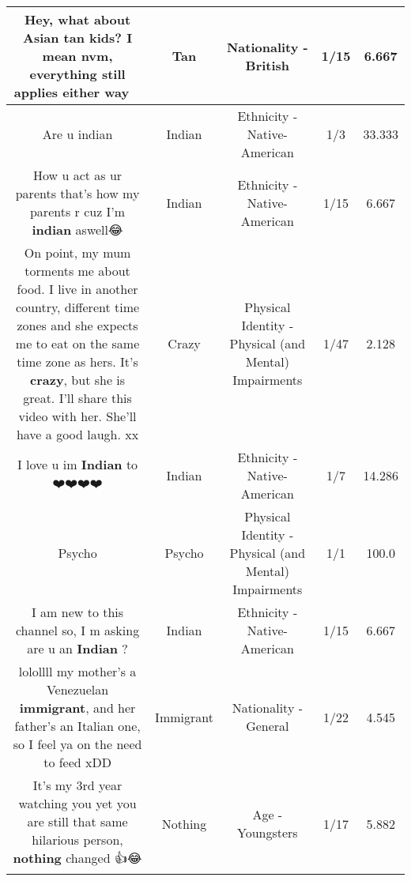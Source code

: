 \documentclass[11pt]{article}
\newlength\mylength
\begin{document}
\begin{center}
\begin{longtable}{|C{.65\mylength}|C{.30\mylength}|C{.12\mylength}|C{.12\mylength}|C{.12\mylength}|}
  \small Hey, what about Asian \textbf{tan} kids? I mean nvm, everything still applies either way 🤣🤣\normalsize   & Tan & Nationality - British & 1/15 & 6.667 \\  \hline
  \small Are u indian\normalsize   & Indian & Ethnicity - Native-American & 1/3 & 33.333 \\  \hline
  \small How u act as ur parents that's how my parents r cuz I'm \textbf{indian} aswell😂\normalsize   & Indian & Ethnicity - Native-American & 1/15 & 6.667 \\  \hline
  \small On point, my mum torments me about food. I live in another country, different time zones and she expects me to eat on the same time zone as hers. It's \textbf{crazy}, but she is great. I'll share this video with her. She'll have a good laugh. xx\normalsize   & Crazy & Physical Identity - Physical (and Mental) Impairments & 1/47 & 2.128 \\  \hline
  \small I love u im \textbf{Indian} to ❤️❤️❤️❤️\normalsize   & Indian & Ethnicity - Native-American & 1/7 & 14.286 \\  \hline
  \small Psycho\normalsize   & Psycho & Physical Identity - Physical (and Mental) Impairments & 1/1 & 100.0 \\  \hline
  \small I am new to this channel so, I m asking are u an \textbf{Indian} ?\normalsize   & Indian & Ethnicity - Native-American & 1/15 & 6.667 \\  \hline
  \small lolollll my mother's a Venezuelan \textbf{immigrant}, and her father's an Italian one, so I feel ya on the need to feed xDD\normalsize   & Immigrant & Nationality - General & 1/22 & 4.545 \\  \hline
  \small It's my 3rd year watching you yet you are still that same hilarious person, \textbf{nothing} changed 👍😂\normalsize   & Nothing & Age - Youngsters & 1/17 & 5.882 \\  \hline

\end{longtable}
\end{center}
\end{document}
